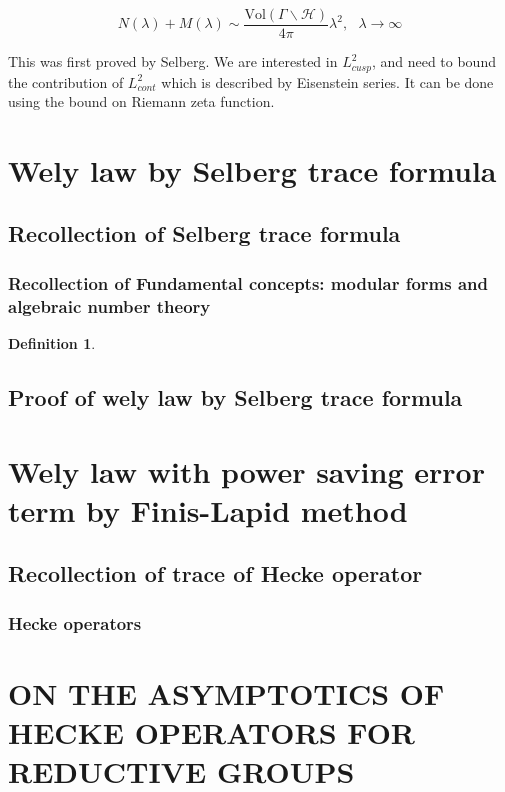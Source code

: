 \documentclass[12pt,a4paper,english]{article}
\theoremstyle{plain}
\theoremstyle{definition}
\newtheorem{defi}{Definition}
\theoremstyle{remark}
\begin{document}
    \begin{equation*}
    N(\lambda)+M(\lambda) \sim \frac{\text{Vol}(\Gamma\backslash \mathcal{H})}{4\pi}\lambda^{2},\ \ \ \lambda\rightarrow\infty    
    \end{equation*}
    
    
    This was first proved by Selberg. We are interested in $L^{2}_{cusp}$, and need to bound the contribution of $L^{2}_{cont}$ which is described by Eisenstein series. It can be done using the bound on Riemann zeta function.
\section{Wely law by Selberg trace formula}
\subsection{Recollection of Selberg trace formula}
\subsubsection{Recollection of Fundamental concepts: modular forms and algebraic number theory}
\begin{defi}

\end{defi}
\subsection{Proof of wely law by Selberg trace formula}
\section{Wely law with power saving error term by Finis-Lapid method}
\subsection{Recollection of trace of Hecke operator}
\subsubsection{Hecke operators}
\section{ON THE ASYMPTOTICS OF HECKE OPERATORS FOR REDUCTIVE
GROUPS}
\end{document}

